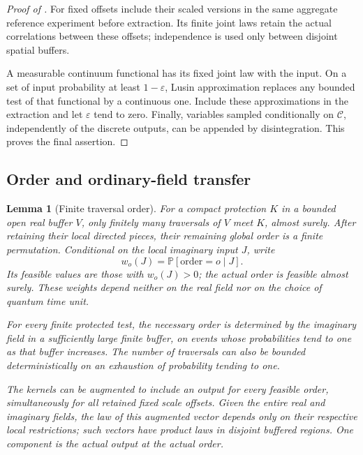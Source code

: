 \documentclass[11pt]{article}
\numberwithin{equation}{section}
\newtheorem{lemma}[theorem]{Lemma}
\theoremstyle{definition}
\theoremstyle{remark}
\newcommand{\1}{\mathbf 1}
\begin{document}
\begin{proof}[Proof of ]
For fixed offsets include their scaled versions in the same aggregate
reference experiment before extraction. Its finite joint laws retain
the actual correlations between these offsets; independence is used
only between disjoint spatial buffers.

A measurable continuum functional has its fixed joint law with the
input. On a set of input probability at least \(1-\varepsilon\),
Lusin approximation replaces any bounded test of that functional by
a continuous one. Include these approximations in the extraction and
let \(\varepsilon\) tend to zero. Finally, variables sampled
conditionally on \(\mathcal C\), independently of the discrete outputs,
can be appended by disintegration. This proves the final assertion.
\end{proof}

\subsection{Order and ordinary-field transfer}

\begin{lemma}[Finite traversal order]\label{ker:finite-order}
For a compact protection \(K\) in a bounded open real buffer \(V\),
only finitely many traversals of \(V\) meet \(K\), almost surely.
After retaining their local directed pieces, their remaining global
order is a finite permutation.  Conditional on the local imaginary
input \(J\), write
\[
 w_o(J)=\mathbb P[\text{order}=o\mid J].
\]
Its feasible values are those with \(w_o(J)>0\); the actual order is
feasible almost surely.  These weights depend neither on the real
field nor on the choice of quantum time unit.

For every finite protected test, the necessary order is determined
by the imaginary field in a sufficiently large finite buffer, on
events whose probabilities tend to one as that buffer increases.
The number of traversals can also be bounded deterministically on
an exhaustion of probability tending to one.

The kernels can be augmented to include an output for every feasible
order, simultaneously for all retained fixed scale offsets.  Given
the entire real and imaginary fields, the law of this augmented
vector depends only on their respective local restrictions; such
vectors have product laws in disjoint buffered regions.  One component
is the actual output at the actual order.
\end{lemma}
\end{document}
